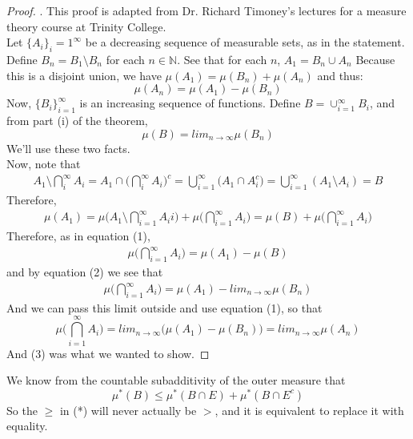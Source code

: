 \documentclass[12pt]{article}
\newenvironment{problem}[2][Problem]{\begin{trivlist}
\item[\hskip \labelsep {\bfseries #1}\hskip \labelsep {\bfseries #2.}]}{\end{trivlist}}
\theoremstyle{definition}
\theoremstyle{definition}
\theoremstyle{definition}
\theoremstyle{definition}
\begin{document}
\begin{problem}{1.20}
\begin{proof}. This proof is adapted from Dr. Richard Timoney's lectures for a measure theory course at Trinity College. \\
Let $\{A_i\}_i=1^{\infty}$ be a decreasing sequence of measurable sets, as in the statement. Define $B_n = B_1 \setminus B_n$ for each $n \in \mathbb{N}$. See that for each $n$, $A_1 = B_n \cup A_n$ Because this is a disjoint union, we have $ \mu(A_1) = \mu(B_n) + \mu(A_n)$
and thus:
\begin{equation}
\mu(A_n) = \mu(A_1) - \mu(B_n)
\end{equation}
Now, $\{B_i\}_{i=1}^\infty$ is an increasing sequence of functions. Define $B = \cup_{i=1}^\infty B_i $, and from part (i) of the theorem, 
\begin{equation}
\mu(B) = lim_{n \to \infty} \mu(B_n) 
\end{equation} 
We'll use these two facts. \\
Now, note that \begin{align*}
A_1 \setminus \bigcap^{\infty}_i A_i = A_1 \cap \big(\bigcap^{\infty}_i A_i \big)^c  = \bigcup_{i=1}^\infty \big(A_1 \cap A_i^c\big) = \bigcup_{i=1}^\infty (A_1 \setminus A_i) = B
\end{align*}
Therefore, 
\begin{align*}
\mu(A_1) = \mu\big(A_1 \setminus \bigcap_{i=1}^\infty A_ii \big) + \mu \big(\bigcap_{i=1}^\infty A_i \big) = \mu (B) + \mu \big(\bigcap_{i=1}^\infty A_i \big)
\end{align*}
Therefore, as in equation (1), 
\begin{align*}
\mu\big(\bigcap_{i=1}^\infty A_i\big) = \mu(A_1) - \mu(B)
\end{align*} 
and by equation (2) we see that
\begin{align*}
\mu\big(\bigcap_{i=1}^\infty A_i\big) = \mu(A_1) - lim_{n \to \infty} \mu(B_n)
\end{align*}
And we can pass this limit outside and use equation (1), so that
\begin{equation}
\mu\big(\bigcap_{i=1}^\infty A_i\big) = lim_{n \to \infty} \big( \mu(A_1) - \mu(B_n) \big) = lim_{n \to \infty} \mu(A_n)
\end{equation}
And (3) was what we wanted to show.
\end{proof}
\end{problem}

\begin{problem}{2.10}
We know from the countable subadditivity of the outer measure that 
$$\mu^*(B) \leq \mu^*(B \cap E) + \mu^*(B \cap E^c) $$
So the $\geq$ in (*) will never actually be $>$, and it is equivalent to replace it with equality.
\end{problem}
\end{document}
